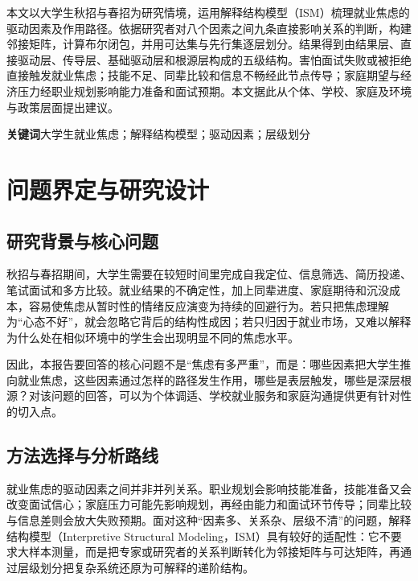 \documentclass[UTF8,a4paper,zihao=-4]{ctexart}
\begin{document}
\hypersetup{pageanchor=false}

\setcounter{page}{1}
\hypersetup{pageanchor=true}

\noindent\makebox[\linewidth][c]{\bfseries\abstractname}\par
\nobreak\smallskip
本文以大学生秋招与春招为研究情境，运用解释结构模型（ISM）梳理就业焦虑的驱动因素及作用路径。依据研究者对八个因素之间九条直接影响关系的判断，构建邻接矩阵，计算布尔闭包，并用可达集与先行集逐层划分。结果得到由结果层、直接驱动层、传导层、基础驱动层和根源层构成的五级结构。害怕面试失败或被拒绝直接触发就业焦虑；技能不足、同辈比较和信息不畅经此节点传导；家庭期望与经济压力经职业规划影响能力准备和面试预期。本文据此从个体、学校、家庭及环境与政策层面提出建议。

\noindent\textbf{关键词}\quad 大学生就业焦虑；解释结构模型；驱动因素；层级划分

\section{问题界定与研究设计}

\subsection{研究背景与核心问题}

秋招与春招期间，大学生需要在较短时间里完成自我定位、信息筛选、简历投递、笔试面试和多方比较。就业结果的不确定性，加上同辈进度、家庭期待和沉没成本，容易使焦虑从暂时性的情绪反应演变为持续的回避行为。若只把焦虑理解为“心态不好”，就会忽略它背后的结构性成因；若只归因于就业市场，又难以解释为什么处在相似环境中的学生会出现明显不同的焦虑水平。

因此，本报告要回答的核心问题不是“焦虑有多严重”，而是：哪些因素把大学生推向就业焦虑，这些因素通过怎样的路径发生作用，哪些是表层触发，哪些是深层根源？对该问题的回答，可以为个体调适、学校就业服务和家庭沟通提供更有针对性的切入点。

\subsection{方法选择与分析路线}

就业焦虑的驱动因素之间并非并列关系。职业规划会影响技能准备，技能准备又会改变面试信心；家庭压力可能先影响规划，再经由能力和面试环节传导；同辈比较与信息差则会放大失败预期。面对这种“因素多、关系杂、层级不清”的问题，解释结构模型（Interpretive Structural Modeling，ISM）具有较好的适配性：它不要求大样本测量，而是把专家或研究者的关系判断转化为邻接矩阵与可达矩阵，再通过层级划分把复杂系统还原为可解释的递阶结构。
\end{document}
